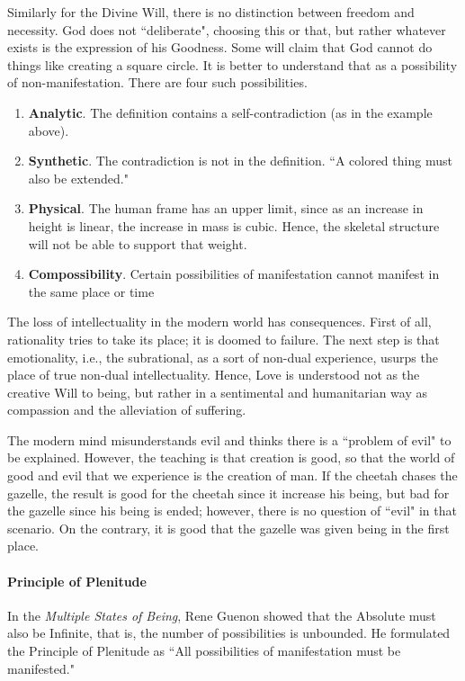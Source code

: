 Similarly for the Divine Will, there is no distinction between freedom and necessity. God does not ``deliberate", choosing this or that, but rather whatever exists is the expression of his Goodness. Some will claim that God cannot do things like creating a square circle. It is better to understand that as a possibility of non-manifestation. There are four such possibilities.

\begin{enumerate}
\item \textbf{Analytic}. The definition contains a self-contradiction (as in the example above). 
\item \textbf{Synthetic}. The contradiction is not in the definition. ``A colored thing must also be extended." 
\item \textbf{Physical}. The human frame has an upper limit, since as an increase in height is linear, the increase in mass is cubic. Hence, the skeletal structure will not be able to support that weight. 
\item \textbf{Compossibility}. Certain possibilities of manifestation cannot manifest in the same place or time 
\end{enumerate}
The loss of intellectuality in the modern world has consequences. First of all, rationality tries to take its place; it is doomed to failure. The next step is that emotionality, i.e., the subrational, as a sort of non-dual experience, usurps the place of true non-dual intellectuality. Hence, Love is understood not as the creative Will to being, but rather in a sentimental and humanitarian way as compassion and the alleviation of suffering.

The modern mind misunderstands evil and thinks there is a ``problem of evil" to be explained. However, the teaching is that creation is good, so that the world of good and evil that we experience is the creation of man. If the cheetah chases the gazelle, the result is good for the cheetah since it increase his being, but bad for the gazelle since his being is ended; however, there is no question of ``evil" in that scenario. On the contrary, it is good that the gazelle was given being in the first place.

\paragraph{Principle of Plenitude}
In the \emph{Multiple States of Being}, Rene Guenon showed that the Absolute must also be Infinite, that is, the number of possibilities is unbounded. He formulated the Principle of Plenitude as ``All possibilities of manifestation must be manifested."

